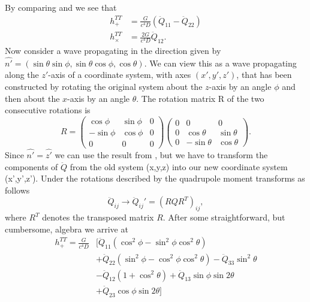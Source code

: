 By comparing  and  we see that
\begin{align} \label{eqT:zhchx}
h_{+}^{TT} &= \frac{G}{c^4 D} (\ddot{Q}_{11}-\ddot{Q}_{22}) \\ \nonumber
h_{\times}^{TT} &= \frac{2G}{c^4 D} \ddot{Q}_{12}.
\end{align}
Now consider a wave propagating in the direction given by $\hat{n'} = (\sin{\theta} \sin{\phi}, \sin{\theta} \cos{\phi},\cos{\theta})$.
We can view this as a wave propagating along the $z'$-axis of a coordinate system, with axes $(x',y',z')$, that has been constructed  
by rotating the original system about the $z$-axis by an angle $\phi$ and then about the $x$-axis by an angle $\theta$.
The rotation matrix R of the two consecutive rotations is
\begin{equation} \label{eqT:pjz}
R = 
  \begin{pmatrix}
    \cos{\phi} & \sin{\phi} & 0  \\
    -\sin{\phi} & \cos{\phi} & 0 \\
    0 & 0 & 0
  \end{pmatrix}
  \begin{pmatrix}
    0 & 0 & 0  \\
    0& \cos{\theta} & \sin{\theta} \\
    0 & -\sin{\theta} & \cos{\theta}
  \end{pmatrix}.
\end{equation}
Since $\hat{n'} = \hat{z'}$ we can use the result from , but we have to
transform the components of $\ddot{Q}$ from the old system (x,y,z) into our new coordinate system (x',y',z').
Under the rotations described by  the quadrupole moment transforms as follows
\begin{equation}
\ddot{Q}_{ij} \rightarrow \ddot{Q}_{ij}' = (R Q R^T)_{ij},
\end{equation}
where $R^T$ denotes the transposed matrix $R$.
After some straightforward, but cumbersome, algebra we arrive at
\begin{align}
\label{eqT:hp}
h_{+}^{TT} = \frac{G}{c^4 D} & \Big[ \ddot{Q}_{11} (\cos^2{\phi} - \sin^2{\phi} \cos^2{\theta})  \\ \nonumber
& + \ddot{Q}_{22} (\sin^2{\phi} - \cos^2{\phi} \cos^2{\theta}) - \ddot{Q}_{33} \sin^2{\theta} \\ \nonumber
& - \ddot{Q}_{12} (1 + \cos^2{\theta}) + \ddot{Q}_{13} \sin{\phi} \sin{2\theta} \\ \nonumber
& + \ddot{Q}_{23} \cos{\phi} \sin{2\theta} \Big]
\end{align}

